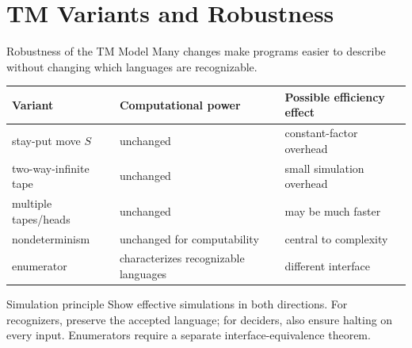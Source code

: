 \documentclass[10pt]{beamer}
\begin{document}

\section{TM Variants and Robustness}

\begin{frame}{Robustness of the TM Model}
  Many changes make programs easier to describe without changing which languages are recognizable.
  \small
  \begin{center}
  \begin{tabular}{L{2.2cm}L{3.2cm}L{3.4cm}}
    \toprule
    Variant & Computational power & Possible efficiency effect \\
    \midrule
    stay-put move $S$ & unchanged & constant-factor overhead \\
    two-way-infinite tape & unchanged & small simulation overhead \\
    multiple tapes/heads & unchanged & may be much faster \\
    nondeterminism & unchanged for computability & central to complexity \\
    enumerator & characterizes recognizable languages & different interface \\
    \bottomrule
  \end{tabular}
  \end{center}
  \begin{block}{Simulation principle}
    Show effective simulations in both directions. For recognizers,
    preserve the accepted language; for deciders, also ensure halting on
    every input. Enumerators require a separate interface-equivalence theorem.
  \end{block}
\end{frame}
\end{document}
